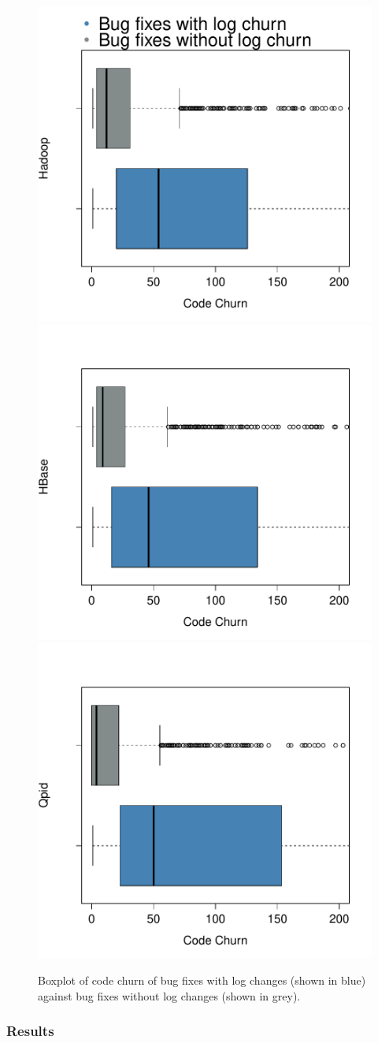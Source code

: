  \begin{figure}[t]
 	\centering
 	\caption{Boxplot of code churn of bug fixes with log changes (shown in blue) against bug fixes without log changes (shown in grey).}
 	\label{fig:figure3}
 	
 	\includegraphics[width=.49\textwidth]{HadoopBoxPlot}
 	\hfill
 	\includegraphics[width=.49\textwidth]{HBaseBoxPlot}\hfill
 	\includegraphics[width=.49\textwidth]{QpidBoxPlot}
 	
 \end{figure}


\subsubsection*{Results}

